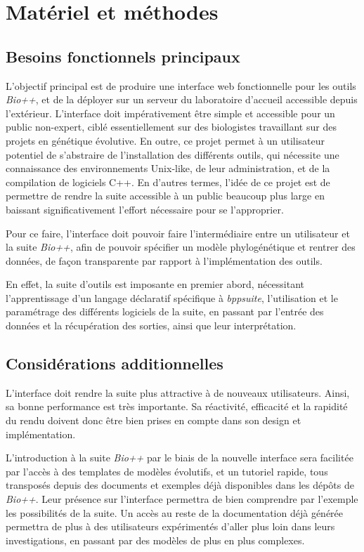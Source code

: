 \section{Matériel et méthodes}

\subsection{Besoins fonctionnels principaux}

L'objectif principal est de produire une interface web fonctionnelle pour les outils \textit{Bio++},
et de la déployer sur un serveur du laboratoire d'accueil accessible depuis l'extérieur.
L'interface doit impérativement être simple et accessible pour un public non-expert,
ciblé essentiellement sur des biologistes travaillant sur des projets en génétique évolutive.
En outre, ce projet permet à un utilisateur potentiel
de s'abstraire de l'installation des différents outils,
qui nécessite une connaissance des environnements Unix-like, de 
leur administration, et de la compilation de logiciels C++.
En d'autres termes, l'idée de ce projet
est de permettre de rendre la suite accessible
à un public beaucoup plus large
en baissant significativement l'effort nécessaire
pour se l'approprier.

Pour ce faire, l'interface doit pouvoir faire l'intermédiaire entre un utilisateur
et la suite \textit{Bio++},
afin de pouvoir spécifier un modèle phylogénétique et rentrer des données,
de façon transparente par rapport à l'implémentation des outils.

En effet, la suite d'outils est imposante en premier abord,
nécessitant l'apprentissage d'un langage déclaratif spécifique à \textit{bppsuite},
l'utilisation et le paramétrage des différents logiciels de la suite,
en passant par l'entrée des données et la récupération des sorties,
ainsi que leur interprétation.


\subsection{Considérations additionnelles}

L'interface doit rendre la suite plus attractive à de nouveaux utilisateurs.
Ainsi, sa bonne performance est très importante.
Sa réactivité, efficacité et la rapidité du rendu
doivent donc être bien prises en compte dans son design et implémentation.

L'introduction à la suite \textit{Bio++} par le biais de la nouvelle interface
sera facilitée par l'accès à des templates de modèles évolutifs,
et un tutoriel rapide,
tous transposés depuis des documents et exemples
déjà disponibles dans les dépôts de \textit{Bio++}.
Leur présence sur l'interface permettra de bien comprendre par l'exemple
les possibilités de la suite.
Un accès au reste de la documentation déjà générée permettra de plus
à des utilisateurs expérimentés d'aller plus loin dans leurs investigations,
en passant par des modèles de plus en plus complexes.


